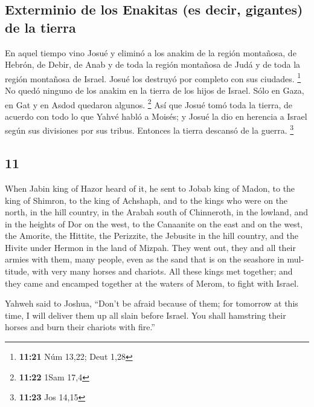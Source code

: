 \begin{paracol}{2}
\hypertarget{exterminio-de-los-enakitas-es-decir-gigantes-de-la-tierra}{%
\subsection{Exterminio de los Enakitas (es decir, gigantes) de la
tierra}\label{exterminio-de-los-enakitas-es-decir-gigantes-de-la-tierra}}

 En aquel tiempo vino Josué y eliminó a los anakim de la
región montañosa, de Hebrón, de Debir, de Anab y de toda la región
montañosa de Judá y de toda la región montañosa de Israel. Josué los
destruyó por completo con sus ciudades. \footnote{\textbf{11:21} Núm
  13,22; Deut 1,28}  No quedó ninguno de los anakim en la
tierra de los hijos de Israel. Sólo en Gaza, en Gat y en Asdod quedaron
algunos. \footnote{\textbf{11:22} 1Sam 17,4}  Así que
Josué tomó toda la tierra, de acuerdo con todo lo que Yahvé habló a
Moisés; y Josué la dio en herencia a Israel según sus divisiones por sus
tribus. Entonces la tierra descansó de la guerra. \footnote{\textbf{11:23}
  Jos 14,15}

\switchcolumn
\begin{otherlanguage}{english}

\hypertarget{section-21}{%
\section{11}\label{section-21}}

 When Jabin king of Hazor heard of it, he sent to Jobab
king of Madon, to the king of Shimron, to the king of Achshaph,
 and to the kings who were on the north, in the hill
country, in the Arabah south of Chinneroth, in the lowland, and in the
heights of Dor on the west,  to the Canaanite on the east
and on the west, the Amorite, the Hittite, the Perizzite, the Jebusite
in the hill country, and the Hivite under Hermon in the land of Mizpah.
 They went out, they and all their armies with them, many
people, even as the sand that is on the seashore in multitude, with very
many horses and chariots.  All these kings met together;
and they came and encamped together at the waters of Merom, to fight
with Israel.

 Yahweh said to Joshua, ``Don't be afraid because of them;
for tomorrow at this time, I will deliver them up all slain before
Israel. You shall hamstring their horses and burn their chariots with
fire.''


\end{otherlanguage}
\end{paracol}

